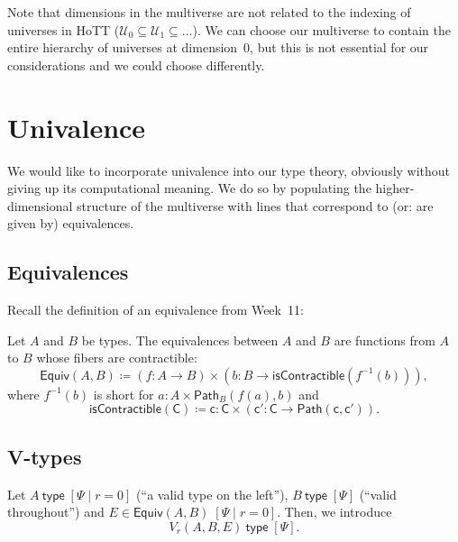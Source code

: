 \documentclass{article} \usepackage{chtt-notes} \usepackage{stmaryrd}
\newcommand{\itype}[1]{#1~\mathsf{type}}
\newcommand{\di}[1]{\;[#1]}
\newcommand{\ps}{\di{\Psi}}
\newcommand{\Path}{\mathsf{Path}}
\begin{document}
Note that dimensions in the multiverse are not related to the indexing of universes in HoTT ($\mathcal{U}_0 \subseteq \mathcal{U}_1 \subseteq \dots$).
We can choose our multiverse to contain the entire hierarchy of universes at dimension~0, but this is not essential for our considerations and we could choose differently.

\section{Univalence}
We would like to incorporate univalence into our type theory, obviously without giving up its computational meaning.
We do so by populating the higher-dimensional structure of the multiverse with lines that correspond to (or: are given by) equivalences.


\subsection{Equivalences}
Recall the definition of an equivalence from Week~11:
\begin{definition}[Equivalences]
    Let $A$ and $B$ be types.
    The equivalences between $A$ and $B$ are functions from $A$ to $B$ whose fibers are contractible:
    \[ \mathsf{Equiv}(A, B) \coloneqq (f : A \to B) \times (b : B \to \mathsf{isContractible}(f^{-1}(b))), \]
    where $f^{-1}(b)$ is short for $a : A \times \Path_{B}(f(a), b)$ and
    \[ \mathsf{isContractible(C) \coloneqq c : C \times (c' : C \to \Path(c, c'))}. \]
\end{definition}

\subsection{V-types}
Let $\itype{A}\;[\Psi \mid r = 0]$ (``a valid type on the left''), $\itype{B}\ps$ (``valid throughout'') and $E \in \mathsf{Equiv}(A, B)\;[\Psi \mid r = 0]$.
Then, we introduce
\[ \itype{V_r(A, B, E)}\ps. \]
\end{document}
